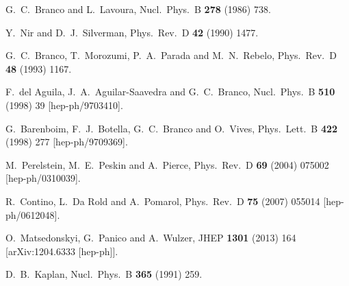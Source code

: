 \documentclass[12pt,a4paper]{article}
\begin{document}
\begin{thebibliography}{99}
  G.~C.~Branco and L.~Lavoura,
  Nucl.\ Phys.\ B {\bf 278} (1986) 738.

  Y.~Nir and D.~J.~Silverman,
  Phys.\ Rev.\ D {\bf 42} (1990) 1477.

  G.~C.~Branco, T.~Morozumi, P.~A.~Parada and M.~N.~Rebelo,
  Phys.\ Rev.\ D {\bf 48} (1993) 1167.

  F.~del Aguila, J.~A.~Aguilar-Saavedra and G.~C.~Branco,
  Nucl.\ Phys.\ B {\bf 510} (1998) 39
  [hep-ph/9703410].

  G.~Barenboim, F.~J.~Botella, G.~C.~Branco and O.~Vives,
  Phys.\ Lett.\ B {\bf 422} (1998) 277
  [hep-ph/9709369].

  M.~Perelstein, M.~E.~Peskin and A.~Pierce,
  Phys.\ Rev.\ D {\bf 69} (2004) 075002
  [hep-ph/0310039].

  R.~Contino, L.~Da Rold and A.~Pomarol,
  Phys.\ Rev.\ D {\bf 75} (2007) 055014
  [hep-ph/0612048].

  
  O.~Matsedonskyi, G.~Panico and A.~Wulzer,
  JHEP {\bf 1301} (2013) 164
  [arXiv:1204.6333 [hep-ph]].

  D.~B.~Kaplan,
  Nucl.\ Phys.\ B {\bf 365} (1991) 259.


\end{thebibliography}
\end{document}
